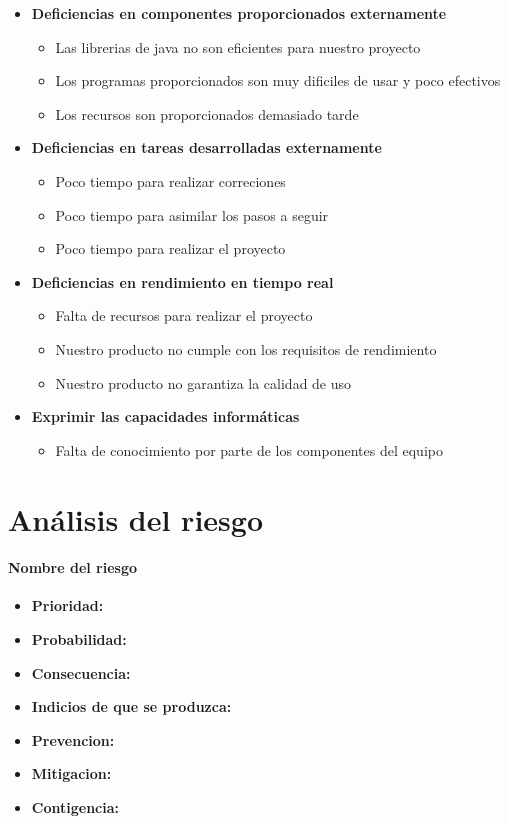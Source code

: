 \documentclass[spanish,a4paper,12pt]{report}	%
\begin{document}
\begin{itemize}
\begin{itemize}
	\end{itemize}
\item \textbf {Deficiencias en componentes proporcionados externamente}
	\begin{itemize}
		\item {Las librerias de java no son eficientes para nuestro proyecto}
		\item {Los programas proporcionados son muy dificiles de usar y poco efectivos}
		\item {Los recursos son proporcionados demasiado tarde}

	\end{itemize}
\item \textbf {Deficiencias en tareas desarrolladas externamente}
	\begin{itemize}
		\item {Poco tiempo para realizar correciones}
		\item {Poco tiempo para asimilar los pasos a seguir}
		\item {Poco tiempo para realizar el proyecto}
	\end{itemize}
\item \textbf {Deficiencias en rendimiento en tiempo real}
	\begin{itemize}
		\item {Falta de recursos para realizar el proyecto}
		\item {Nuestro producto no cumple con los requisitos de rendimiento}
		\item {Nuestro producto no garantiza la calidad de uso}
	\end{itemize}
\item \textbf {Exprimir las capacidades informáticas}
	\begin{itemize}
		\item {Falta de conocimiento por parte de los componentes del equipo}
	\end{itemize}
\end{itemize}


\newpage
\mbox{}
\thispagestyle{empty}						%
\newpage

\part{Análisis del riesgo}

\subsection*{Nombre del riesgo}			%
	\begin{itemize}
		\item \textbf {Prioridad: }
		\item \textbf {Probabilidad: }
		\item \textbf {Consecuencia: }
		\item \textbf {Indicios de que se produzca: }
		\item \textbf {Prevencion: }
		\item \textbf {Mitigacion: }
		\item \textbf {Contigencia: }
	\end{itemize}
\end{document}
